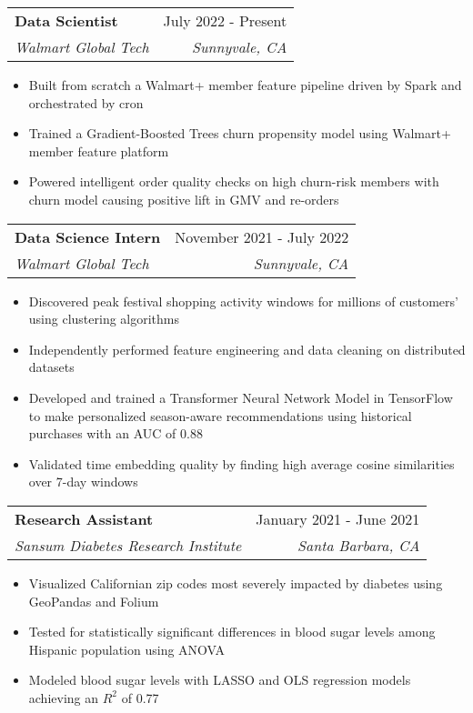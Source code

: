 \documentclass[letterpaper,11pt]{article}
\makeatletter
\newcommand{\resumeItem}[1]{
  \item\small{
    {#1 \vspace{-2pt}}
  }
}
\newcommand{\resumeSubheading}[4]{
  \vspace{-2pt}\item
    \begin{tabular*}{0.97\textwidth}[t]{l@{\extracolsep{\fill}}r}
      \textbf{#1} & #2 \\
      \textit{\small#3} & \textit{\small #4} \\
    \end{tabular*}\vspace{-8pt}
}
\newcommand{\resumeSubSubheading}[2]{
    \item
    \begin{tabular*}{0.97\textwidth}{l@{\extracolsep{\fill}}r}
      \textit{\small#1} & \textit{\small #2} \\
    \end{tabular*}\vspace{-5pt}
}
\newcommand{\resumeSubHeadingListEnd}{\end{itemize}}
\newcommand{\resumeItemListStart}{\begin{itemize}}
\newcommand{\resumeItemListEnd}{\end{itemize}\vspace{-5pt}}
\makeatother
\begin{document}
    \resumeSubheading
      {Data Scientist}{July 2022 - Present}
      {Walmart Global Tech}{Sunnyvale, CA}
      \resumeItemListStart
        \resumeItem{Built from scratch a Walmart+ member feature pipeline driven by Spark and orchestrated by cron}
        \resumeItem{Trained a Gradient-Boosted Trees churn propensity model using Walmart+ member feature platform}
        \resumeItem{Powered intelligent order quality checks on high churn-risk members with churn model causing positive lift in GMV and re-orders} 
      \resumeItemListEnd

    \resumeSubheading
      {Data Science Intern}{November 2021 - July 2022}
      {Walmart Global Tech}{Sunnyvale, CA}
      
      \resumeItemListStart
        \resumeItem{Discovered peak festival shopping activity windows for millions of customers' using clustering algorithms}
        \resumeItem{Independently performed feature engineering and data cleaning on distributed datasets}
        \resumeItem{Developed and trained a Transformer Neural Network Model in TensorFlow to make personalized season-aware recommendations using historical purchases with an AUC of 0.88} 
        \resumeItem{Validated time embedding quality by finding high average cosine similarities over 7-day windows}
      \resumeItemListEnd
      

    \resumeSubheading
      {Research Assistant}{January 2021 - June 2021}
      {Sansum Diabetes Research Institute}{Santa Barbara, CA}
      
      \resumeItemListStart
        \resumeItem{Visualized Californian zip codes most severely impacted by diabetes using GeoPandas and Folium}
        
        \resumeItem{Tested for statistically significant differences in blood sugar levels among Hispanic population using ANOVA}
        
        \resumeItem{Modeled blood sugar levels with LASSO and OLS regression models achieving an $R^{2}$ of 0.77}
    
    \resumeItemListEnd
\end{document}

